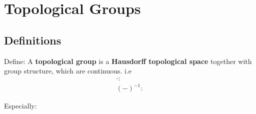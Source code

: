 \documentclass{article}
\begin{document}
	\chapter{Topological Groups}
		\section{Definitions}
			\begin{Def}
				Define: A \textbf{topological group} is a \textbf{Hausdorff topological space} together with group structure, which are continuous. i.e
				\begin{gather*}
					\cdot:\\
					(-)^{-1}:
				\end{gather*}
			\end{Def}
			
			Especially:
			\begin{Def}
				
			\end{Def}
\end{document}
